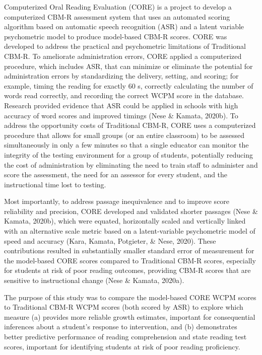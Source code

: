 \documentclass[
  english,
  man, fleqn, noextraspace]{apa6}
\begin{document}
Computerized Oral Reading Evaluation (CORE) is a project to develop a computerized CBM-R assessment system that uses an automated scoring algorithm based on automatic speech recognition (ASR) and a latent variable psychometric model to produce model-based CBM-R scores. CORE was developed to address the practical and psychometric limitations of Traditional CBM-R. To ameliorate administration errors, CORE applied a computerized procedure, which includes ASR, that can minimize or eliminate the potential for administration errors by standardizing the delivery, setting, and scoring; for example, timing the reading for exactly 60 s, correctly calculating the number of words read correctly, and recording the correct WCPM score in the database. Research provided evidence that ASR could be applied in schools with high accuracy of word scores and improved timings (Nese \& Kamata, 2020b). To address the opportunity costs of Traditional CBM-R, CORE uses a computerized procedure that allows for small groups (or an entire classroom) to be assessed simultaneously in only a few minutes so that a single educator can monitor the integrity of the testing environment for a group of students, potentially reducing the cost of administration by eliminating the need to train staff to administer and score the assessment, the need for an assessor for every student, and the instructional time lost to testing.

Most importantly, to address passage inequivalence and to improve score reliability and precision, CORE developed and validated shorter passages (Nese \& Kamata, 2020b), which were equated, horizontally scaled and vertically linked with an alternative scale metric based on a latent-variable psychometric model of speed and accuracy (Kara, Kamata, Potgieter, \& Nese, 2020). These contributions resulted in substantially smaller standard error of measurement for the model-based CORE scores compared to Traditional CBM-R scores, especially for students at risk of poor reading outcomes, providing CBM-R scores that are sensitive to instructional change (Nese \& Kamata, 2020a).

The purpose of this study was to compare the model-based CORE WCPM scores to Traditional CBM-R WCPM scores (both scored by ASR) to explore which measure (a) provides more reliable growth estimates, important for consequential inferences about a student's response to intervention, and (b) demonstrates better predictive performance of reading comprehension and state reading test scores, important for identifying students at risk of poor reading proficiency.
\end{document}
